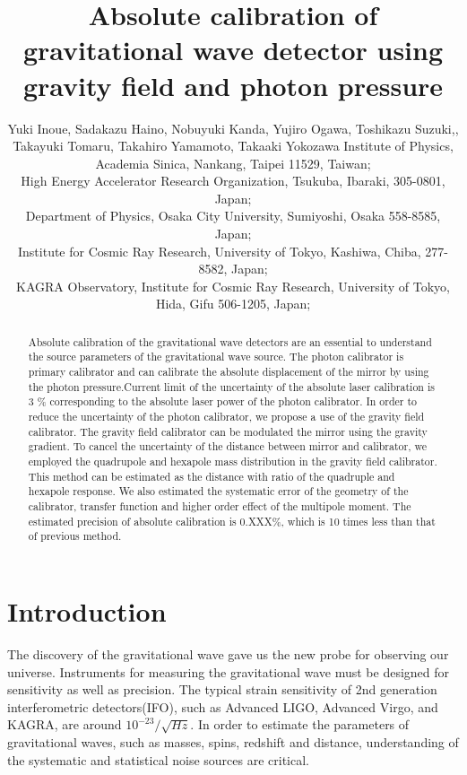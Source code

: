 \documentclass[]{spie}  %
\title{Absolute calibration of gravitational wave detector using gravity field and photon pressure}
\author{Yuki Inoue\supit{a,b}, Sadakazu Haino\supit{a}, Nobuyuki Kanda\supit{c}, Yujiro Ogawa\supit{b}, Toshikazu Suzuki,\supit{d}, Takayuki Tomaru\supit{b}, Takahiro Yamamoto\supit{e}, Takaaki Yokozawa\supit{e}
\skiplinehalf
\supit{a}Institute of Physics, Academia Sinica, Nankang, Taipei 11529, Taiwan; \\
\supit{b}High Energy Accelerator Research Organization, Tsukuba, Ibaraki, 305-0801, Japan;\\
\supit{c}Department of Physics, Osaka City University, Sumiyoshi, Osaka 558-8585, Japan;\\
\supit{d}Institute for Cosmic Ray Research, University of Tokyo, Kashiwa, Chiba, 277-8582, Japan;\\
\supit{e}KAGRA Observatory, Institute for Cosmic Ray Research, University of Tokyo, Hida, Gifu 506-1205, Japan;\\
}
\begin{document}
 
  \maketitle 

\begin{abstract}
Absolute calibration of the gravitational wave detectors are an essential to understand the source parameters of the gravitational wave source. The photon calibrator is primary calibrator and can calibrate the absolute displacement of the mirror by using the photon pressure.Current limit of the uncertainty of the absolute laser calibration is 3 \% corresponding to the absolute laser power of the photon calibrator.  In order to reduce the uncertainty of the photon calibrator, we propose a use of the gravity field calibrator. The gravity field calibrator can be modulated the mirror using the gravity gradient. To cancel the uncertainty of the distance between mirror and calibrator, we employed the quadrupole and hexapole mass distribution in the gravity field calibrator. This method can be estimated as the distance with ratio of the quadruple and hexapole response. We also estimated the systematic error of the geometry of the calibrator, transfer function and higher order effect of the multipole moment. The estimated precision of absolute calibration is 0.XXX\%, which is 10 times less than that of previous method.

\end{abstract}



\section{Introduction}

The discovery of the gravitational wave gave us the new probe for observing our universe. 
Instruments for measuring the gravitational wave must be designed for sensitivity as well as precision.
The typical strain sensitivity of 2nd generation interferometric detectors(IFO), such as Advanced LIGO, Advanced Virgo, and KAGRA, are around $10^{-23}/\sqrt{Hz}$. In order to estimate the parameters of gravitational waves, such as masses, spins, redshift and distance, understanding of the systematic and statistical noise sources are critical.
\end{document}
